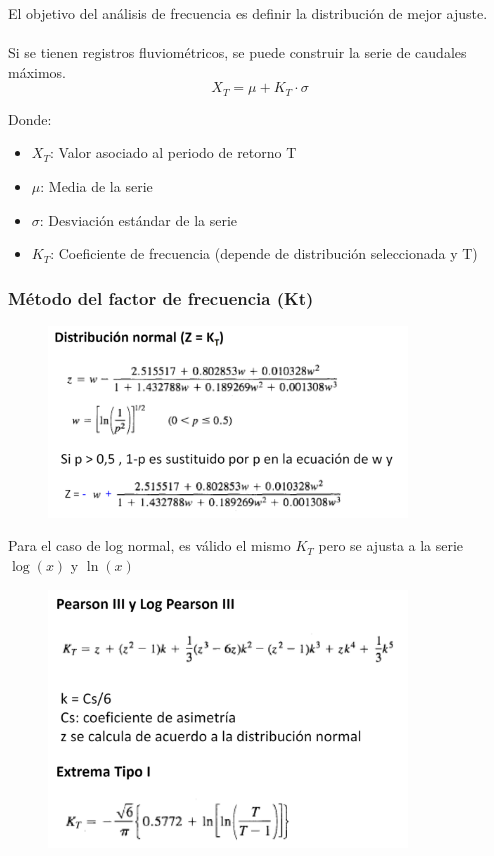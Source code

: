 El objetivo del análisis de frecuencia es definir la distribución de mejor ajuste.
\\\\
Si se tienen registros fluviométricos, se puede construir la serie de caudales máximos.
\begin{equation}
    X_T = \mu + K_T \cdot \sigma
\end{equation}

Donde:
\begin{itemize}
    \item $X_T$: Valor asociado al periodo de retorno T
    \item $\mu$: Media de la serie
    \item $\sigma$: Desviación estándar de la serie
    \item $K_T$: Coeficiente de frecuencia (depende de distribución seleccionada y T) 
\end{itemize}

\subsubsection{Método del factor de frecuencia (Kt)}

\begin{figure}[H]
    \centering
    \includegraphics[width=0.85\textwidth]{imagenes/kt_norm.png}
    \label{fig:kt_norm}
\end{figure}

Para el caso de log normal, es válido el mismo $K_T$ pero se ajusta a la serie $\log{(x)}$ y $\ln{(x)}$

\begin{figure}[H]
    \centering
    \includegraphics[width=0.85\textwidth]{imagenes/kt_2.png}
    \label{fig:kt_2}
\end{figure}


